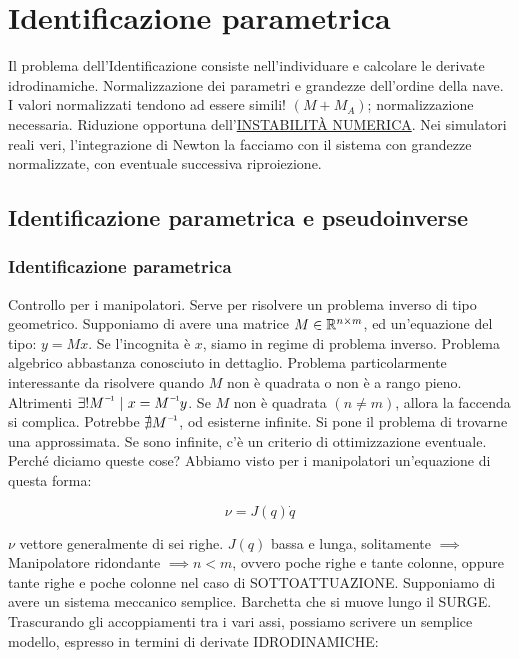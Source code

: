 
\chapter{Identificazione parametrica}
\label{cap:pidnt}

Il problema dell'Identificazione consiste nell'individuare e calcolare le derivate idrodinamiche. Normalizzazione dei parametri e grandezze dell'ordine della nave. I valori normalizzati tendono ad essere simili! $(M+M_A)$; normalizzazione necessaria. Riduzione opportuna dell'\underline{INSTABILIT\`A NUMERICA}. Nei simulatori reali veri, l'integrazione di Newton la facciamo con il sistema con grandezze normalizzate, con eventuale successiva riproiezione.

\section{Identificazione parametrica e pseudoinverse}

\subsection{Identificazione parametrica}

Controllo per i manipolatori. Serve per risolvere un problema inverso di tipo geometrico. Supponiamo di avere una matrice $M\in\mathbb{R}^{n\times m}$, ed un'equazione del tipo: $y=Mx$. Se l'incognita è $x$, siamo in regime di problema inverso. Problema algebrico abbastanza conosciuto in dettaglio. Problema particolarmente interessante da risolvere quando $M$ non è quadrata o non è a rango pieno. Altrimenti $\exists! \inv{M}\ |\ x=\inv{M}y$. Se $M$ non è quadrata $(n\neq m)$, allora la faccenda si complica. Potrebbe $\nexists\inv{M}$, od esisterne infinite. Si pone il problema di trovarne una approssimata. Se sono infinite, c'è un criterio di ottimizzazione eventuale. Perché diciamo queste cose? Abbiamo visto per i manipolatori un'equazione di questa forma:

\[
	\nu = J(q)\dot{q}
\]

$\nu$ vettore generalmente di sei righe. $J(q)$ bassa e lunga, solitamente $\implies$ Manipolatore ridondante $\implies n<m$, ovvero poche righe e tante colonne, oppure tante righe e poche colonne nel caso di SOTTOATTUAZIONE. Supponiamo di avere un sistema meccanico semplice. Barchetta che si muove lungo il SURGE. Trascurando gli accoppiamenti tra i vari assi, possiamo scrivere un semplice modello, espresso in termini di derivate IDRODINAMICHE:

